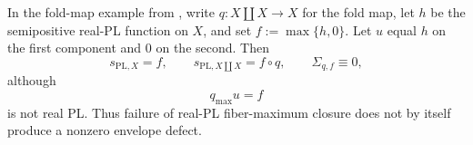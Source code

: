 \begin{corollary}
\label{cor:p031-fold-envelope-without-maximum-closure}
In the fold-map example from
, write
$q:X\amalg X\to X$ for the fold map, let $h$ be the semipositive real-PL
function on $X$, and set $f:=\max\{h,0\}$.  Let $u$ equal $h$ on the first
component and $0$ on the second.  Then
\begin{equation}
\label{eq:p031-fold-envelope-values}
 s_{\mathrm{PL},X}=f,
 \qquad
 s_{\mathrm{PL},X\amalg X}=f\circ q,
 \qquad
 \Sigma_{q,f}\equiv0,
\end{equation}
although
\[
                         q_{\max}u=f
\]
is not real PL.  Thus failure of real-PL fiber-maximum closure does not by
itself produce a nonzero envelope defect.
\end{corollary}
